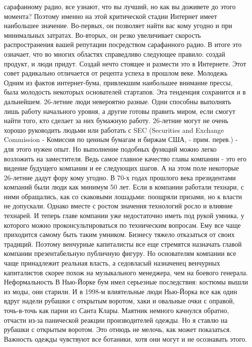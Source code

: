 \documentclass[ebook,12pt,oneside,openany]{memoir}
\begin{document}
сарафанному радио, все узнают, что вы лучший, но как вы доживете до
этого момента? Поэтому именно на этой критической стадии Интернет
имеет наибольшее значение. Во-первых, он позволяет найти вас кому
угодно и при минимальных затратах. Во-вторых, он резко увеличивает
скорость распространения вашей репутации посредством сарафанного
радио. В итоге это означает, что во многих областях справедливо
следующее правило: создай продукт, и люди придут. Создай нечто стоящее
и размести это в Интернете. Этот совет радикально отличается от
рецепта успеха в прошлом веке. Молодежь Одним из фактов интернет-бума,
привлекшим наибольшее внимание прессы, была молодость некоторых
основателей стартапов. Эта тенденция сохранится и в дальнейшем.
26-летние люди невероятно разные. Одни способны выполнять лишь работу
начального уровня, а другие готовы править миром, если смогут найти
того, кто сделает за них бумажную работу. 26-летние могут не очень
хорошо руководить людьми или работать с SEC (Securities and Exchange
Commission - Комиссия по ценным бумагам и биржам США, - прим. перев.)
- для этого нужен опыт. Но выполнение подобных функций можно легко
возложить на заместителя. Ведь самое главное качество главы компании -
это его видение будущего компании и ее следующих шагов. А на этом поле
некоторые 26-летние дадут фору кому угодно. В 70-х годах прошлого века
президентами компаний были люди как минимум 50 лет. Если в компании
работали технари, с ними обращались, как со скаковыми лошадьми:
поощряли призами, но к власти не допускали. Однако вместе с ростом
значения технологий росло и влияние технарей. И теперь главе компании
уже недостаточно иметь под рукой умника, у которого можно
проконсультироваться по техническим вопросам. Ему все чаще приходится
самому быть таким умником. Бизнесу тяжело отказаться от своих
традиций. Поэтому венчурные капиталисты все еще стремятся назначать
главой компании презентабельную публичную фигуру. Но основателям
компании все чаще принадлежит реальная власть, а седовласый назначенец
венчурных капиталистов скорее похож на музыкального менеджера, чем на
боевого генерала. Неформальность В Нью-Йорке бум имел серьезные
последствия: костюмы вышли из моды, они старили. И в 1998-м
влиятельные люди Нью-Йорка все как один вдруг надели рубашки с
открытым воротом, хаки и овальные очки с оправой, точь-в-точь как
парни из Санта Клары. Маятник немного качнулся обратно, отчасти из-за
панической реакции производителей одежды. Но я ставлю на рубашки с
открытым воротом. Это отнюдь не мелочь, как может показаться. Важность
одежды чувствуют все ботаники, хотя они могут и не осознавать этого.
\end{document}
